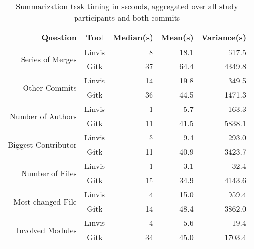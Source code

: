 \begin{table}[htpb]
  \centering
  \caption{Summarization task timing in seconds, aggregated over all study participants and both commits}
  \label{tab:summarization_timing}
  \begin{tabular}{r|c|rrr}
    Question                             & Tool   & Median(s) & Mean(s) & Variance(s) \\\hline
    \multirow{2}{*}{Series of Merges}    & Linvis & 8         & 18.1    & 617.5\\
                                         & Gitk   & 37        & 64.4    & 4349.8\\
    \multirow{2}{*}{Other Commits}       & Linvis & 14        & 19.8    & 349.5\\
                                         & Gitk   & 36        & 44.5    & 1471.3\\
    \multirow{2}{*}{Number of Authors}   & Linvis & 1         & 5.7     & 163.3\\
                                         & Gitk   & 11        & 41.5    & 5838.1\\
    \multirow{2}{*}{Biggest Contributor} & Linvis & 3         & 9.4     & 293.0\\
                                         & Gitk   & 11        & 40.9    & 3423.7\\
    \multirow{2}{*}{Number of Files}     & Linvis & 1         & 3.1     & 32.4\\
                                         & Gitk   & 15        & 34.9    & 4143.6\\
    \multirow{2}{*}{Most changed File}   & Linvis & 4         & 15.0    & 959.4\\
                                         & Gitk   & 14        & 48.4    & 3862.0\\
    \multirow{2}{*}{Involved Modules}    & Linvis & 4         & 5.6     & 19.4\\
                                         & Gitk   & 34        & 45.0    & 1703.4
  \end{tabular}
\end{table}

